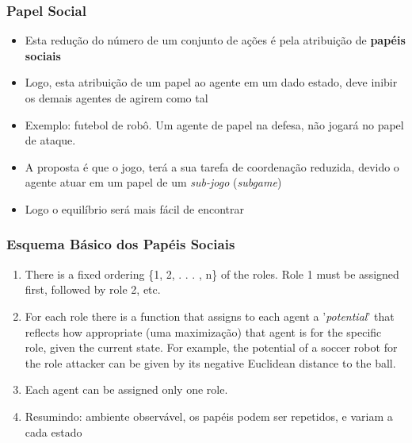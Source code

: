 \begin{frame}
\frametitle{Papel Social}

\begin{itemize}
  \item Esta redução do número de um conjunto de ações é pela atribuição de \textbf{papéis sociais}
  \item Logo, esta  atribuição de um papel ao agente em um dado estado, deve inibir os demais agentes
  de agirem como tal
  \item Exemplo: futebol de robô. Um agente de papel na defesa, não jogará no  papel de ataque. 
  
  \item A proposta é que o jogo, terá a sua tarefa de coordenação reduzida, devido o agente atuar em um papel de um \textit{sub-jogo} (\textit{subgame})
  
  \item Logo o equilíbrio será mais fácil de encontrar

\end{itemize}

\end{frame}

\begin{frame}[allowframebreaks=0.9]
\frametitle{Esquema Básico dos Papéis Sociais}


\begin{enumerate}
  \item There is a fixed ordering \{1, 2, . . . , n\} of the roles. Role 1 must be assigned first, followed by role 2, etc.
  
\item  For each role there is a function that assigns to each agent a '\textit{potential}' that reflects how appropriate (uma maximização) that agent is for the specific role, given the current state. For example, the
potential of a soccer robot for the role attacker can be given by its negative Euclidean distance to the ball.

\item  Each agent can be assigned only one role. 

\item Resumindo: ambiente observável, os papéis podem ser repetidos, e variam a cada estado

\end{enumerate}

\end{frame}

